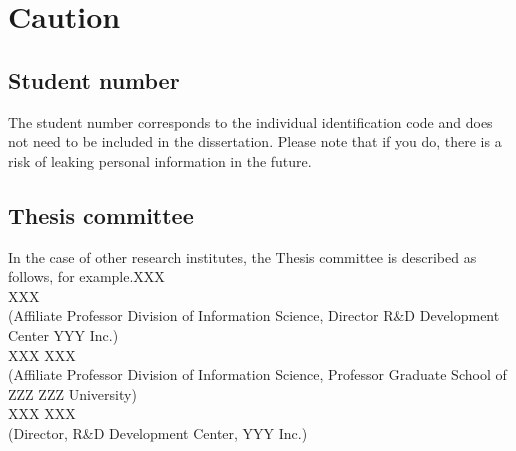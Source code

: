 \section{Caution}
\subsection{Student number}
The student number corresponds to the individual identification code and does not need to be included in the dissertation. Please note that if you do, there is a risk of leaking personal information in the future.

\subsection{Thesis committee}
In the case of other research institutes, the Thesis committee is described as follows, for example.XXX \\
XXX \\
(Affiliate Professor Division of Information Science, Director R&D Development Center YYY Inc.) \\
XXX XXX \\
(Affiliate Professor Division of Information Science, Professor Graduate School of ZZZ ZZZ University) \\
XXX XXX \\
(Director, R&D Development Center, YYY Inc.)
